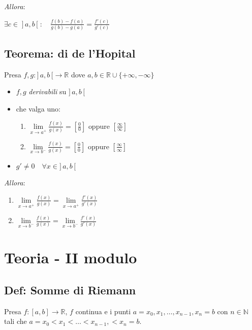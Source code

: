 \documentclass{article}
\begin{document}
\noindent \emph{Allora}:

\setlength{\parindent}{.25in}
$
  \exists c \in \; ] \, a, b \, [ \; : \quad
  \frac{f(b) - f(a)}{g(b) - g(a)} = \frac{f'(c)}{g'(c)}
$

\subsection{Teorema: di de l'Hopital}
Presa $f, g: ] \, a, b \, [ \to \mathbb{R}$ dove $a, b \in \mathbb{R} \cup \{+\infty, -\infty\}$

\begin{itemize}
\item
  $f, g$ \emph{derivabili} su $\boldsymbol{]} \, a, b \, \boldsymbol{[}$
\item
  che valga uno:
  \begin{enumerate}
    \item
      $\lim\limits_{x \to a^+} \frac{f(x)}{g(x)} = [\frac{0}{0}] \text{ oppure } [\frac{\infty}{\infty}]$
    \item
      $\lim\limits_{x \to b^-} \frac{f(x)}{g(x)} = [\frac{0}{0}] \text{ oppure } [\frac{\infty}{\infty}]$
  \end{enumerate}
\item
  $g' \neq 0 \quad \forall x \in ] \, a, b \, [$
\end{itemize}

\noindent \emph{Allora}:

\begin{enumerate}
\item
  $\lim\limits_{x \to a^+} \frac{f(x)}{g(x)} = \lim\limits_{x \to a^+} \frac{f'(x)}{g'(x)}$
\item
  $\lim\limits_{x \to b^-} \frac{f(x)}{g(x)} = \lim\limits_{x \to b^-} \frac{f'(x)}{g'(x)}$
\end{enumerate}

\pagebreak

\section{Teoria - II modulo}

\subsection{Def: Somme di Riemann}

Presa $f: [a, b] \to \mathbb{R}$, $f$ continua e i punti $a = x_0, x_1, \ldots ,
x_{n-1}, x_n = b$ con $n \in \mathbb{N}$ tali che $a = x_0 < x_1 < \ldots < x_{n-1},< x_n = b$.
\end{document}
